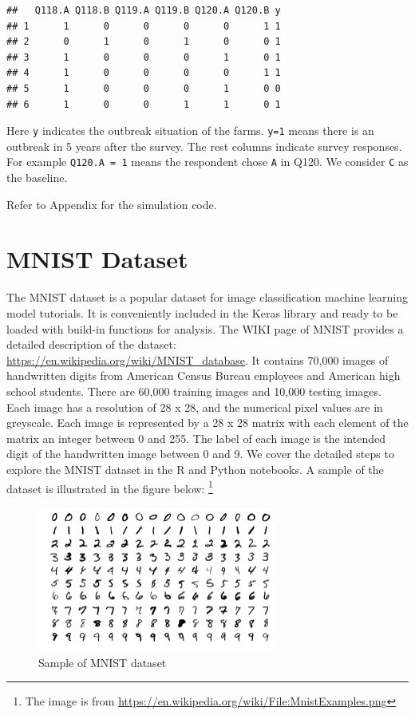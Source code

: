 \documentclass[
  12pt,
]{krantz}
\begin{document}
\begin{verbatim}
##   Q118.A Q118.B Q119.A Q119.B Q120.A Q120.B y
## 1      1      0      0      0      0      1 1
## 2      0      1      0      1      0      0 1
## 3      1      0      0      0      1      0 1
## 4      1      0      0      0      0      1 1
## 5      1      0      0      0      1      0 0
## 6      1      0      0      1      1      0 1
\end{verbatim}

Here \texttt{y} indicates the outbreak situation of the farms. \texttt{y=1} means there is an outbreak in 5 years after the survey. The rest columns indicate survey responses. For example \texttt{Q120.A\ =\ 1} means the respondent chose \texttt{A} in Q120. We consider \texttt{C} as the baseline.

Refer to Appendix for the simulation code.

\hypertarget{mnist-dataset}{%
\section{MNIST Dataset}\label{mnist-dataset}}

The MNIST dataset is a popular dataset for image classification machine learning model tutorials. It is conveniently included in the Keras library and ready to be loaded with build-in functions for analysis. The WIKI page of MNIST provides a detailed description of the dataset: \url{https://en.wikipedia.org/wiki/MNIST_database}. It contains 70,000 images of handwritten digits from American Census Bureau employees and American high school students. There are 60,000 training images and 10,000 testing images. Each image has a resolution of 28 x 28, and the numerical pixel values are in greyscale. Each image is represented by a 28 x 28 matrix with each element of the matrix an integer between 0 and 255. The label of each image is the intended digit of the handwritten image between 0 and 9. We cover the detailed steps to explore the MNIST dataset in the R and Python notebooks. A sample of the dataset is illustrated in the figure below: \footnote{The image is from \url{https://en.wikipedia.org/wiki/File:MnistExamples.png}}

\begin{figure}
\centering
\includegraphics[width=0.7\textwidth,height=\textheight]{images/MnistExamples.png}
\caption{Sample of MNIST dataset}
\end{figure}
\end{document}
